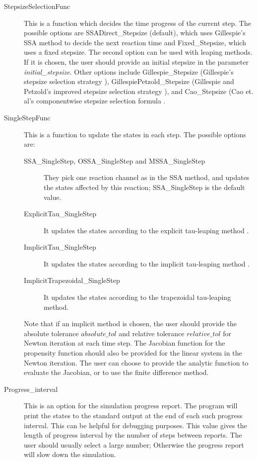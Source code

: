 \documentclass[12pt]{article}
\begin{document}
\begin{description}
\begin{description}
    \item[StepsizeSelectionFunc] This is a function which decides the time
    progress of the current step. The possible options are SSADirect\_Stepsize (default), 
	which
    uses Gillespie's SSA method to decide the next reaction time and  Fixed\_Stepsize,
    which uses a fixed stepsize. The second option can be used with leaping methods. If it
    is chosen, the user should provide an initial stepsize in the parameter
    {\it initial\_stepsize}. Other options include 
	Gillespie\_Stepsize (Gillespie's stepsize selection
    strategy \cite{Gillespie01}), GillespiePetzold\_Stepsize 
	(Gillespie and Petzold's improved stepsize selection
    strategy \cite{gillespie-petzold-03}), and Cao\_Stepsize (Cao et. al's 
	componentwise stepsize selection formula \cite{CaoGP2005_Stepsize}. 

    \item[SingleStepFunc] This is a function to update the states in each step.
    The possible options are:
    \begin{description}
    \item[SSA\_SingleStep, OSSA\_SingleStep and MSSA\_SingleStep] 
	They pick one reaction channel as
    in the SSA method, and updates the states affected by this reaction;
	SSA\_SingleStep is the default value. 
    \item[ExplicitTau\_SingleStep] It updates the states according to the explicit tau-leaping
    method \cite{Gillespie01}.
    \item[ImplicitTau\_SingleStep] It updates the states according to the implicit tau-leaping
    method \cite{rathinam-petzold-gillespie-jchemphys}.
    \item[ImplicitTrapezoidal\_SingleStep] It updates the states according to the 
	trapezoidal tau-leaping method\cite{trapezoidal}.
    \end{description}
    Note that if an implicit method is chosen, the user should provide the
    absolute tolerance $absolute\_tol$ and relative tolerance $relative\_tol$
    for Newton iteration at each time step.
    The Jacobian function for the propensity function should also be provided
    for the linear system in the Newton iteration. The user can choose to provide
    the analytic function to evaluate the Jacobian, or to use the finite difference method.
	

    \item[Progress\_interval] This is an option for the simulation progress report.
    The program will print the states to the standard output at the end of
    each such progress interval. This can be helpful for debugging purposes.
    This value gives the length of progress interval by the number of steps between reports.
    The user should usually select a large number;
    Otherwise the progress report will slow down the simulation.


\end{description}
\end{description}
\end{document}
